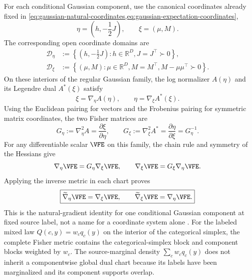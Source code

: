 For each conditional Gaussian component, use the canonical coordinates already fixed in \cref{eq:gaussian-natural-coordinates,eq:gaussian-expectation-coordinates},
\begin{equation}
\eta=\left(h,-\frac12J\right),
\qquad
\xi=(\mu,M).
\label{eq:canonical-natural-expectation-pairs}
\end{equation}
The corresponding open coordinate domains are
\begin{equation}
\begin{aligned}
\mathcal D_\eta
&:=\left\{\left(h,-\frac12J\right):
h\in\mathbb R^D,
J=J^\top\succ0\right\},\\
\mathcal D_\xi
&:=\left\{(\mu,M):
\mu\in\mathbb R^D,
M=M^\top,
M-\mu\mu^\top\succ0\right\}.
\end{aligned}
\label{eq:gaussian-dual-open-domains}
\end{equation}
On these interiors of the regular Gaussian family, the log normalizer $A(\eta)$ and its Legendre dual $A^*(\xi)$ satisfy
\begin{equation}
\xi=\nabla_\eta A(\eta),
\qquad
\eta=\nabla_\xi A^*(\xi).
\label{eq:legendre-coordinate-duality}
\end{equation}
Using the Euclidean pairing for vectors and the Frobenius pairing for symmetric matrix coordinates, the two Fisher matrices are
\begin{equation}
G_\eta
:=\nabla_\eta^2A
=\frac{\partial\xi}{\partial\eta},
\qquad
G_\xi
:=\nabla_\xi^2A^*
=\frac{\partial\eta}{\partial\xi}
=G_\eta^{-1}.
\label{eq:dual-fisher-hessians}
\end{equation}
For any differentiable scalar $\VFE$ on this family, the chain rule and symmetry of the Hessians give
\begin{equation}
\nabla_\eta\VFE
=G_\eta\nabla_\xi\VFE,
\qquad
\nabla_\xi\VFE
=G_\xi\nabla_\eta\VFE.
\label{eq:dual-coordinate-gradient-chain-rule}
\end{equation}
Applying the inverse metric in each chart proves
\begin{equation}
\boxed{
\widetilde\nabla_\eta\VFE
=\nabla_\xi\VFE,
\qquad
\widetilde\nabla_\xi\VFE
=\nabla_\eta\VFE.}
\label{eq:vfe4-natural-gradient-dual-identity}
\end{equation}
This is the natural-gradient identity for one conditional Gaussian component at fixed source label, not a name for a coordinate system alone \citep{Amari1998,Amari2016}. For the labeled mixed law $Q(c,y)=w_cq_c(y)$ on the interior of the categorical simplex, the complete Fisher metric contains the categorical-simplex block and component blocks weighted by $w_c$. The source-marginal density $\sum_cw_cq_c(y)$ does not inherit a componentwise global dual chart because its labels have been marginalized and its component supports overlap.

